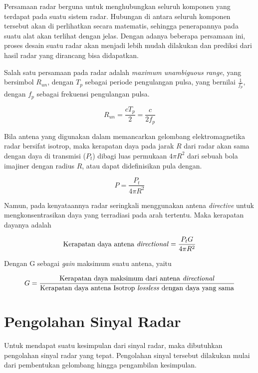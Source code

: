 
Persamaan radar berguna untuk menghubungkan seluruh komponen yang terdapat pada suatu sistem radar. Hubungan di antara seluruh komponen tersebut akan di perlihatkan secara matematis, sehingga penerapannya pada suatu alat akan terlihat dengan jelas. Dengan adanya beberapa persamaan ini, proses desain suatu radar akan menjadi lebih mudah dilakukan dan prediksi dari hasil radar yang dirancang bisa didapatkan.

Salah satu persamaan pada radar adalah \textit{maximum unambiguous range}, yang bersimbol $R_{un}$, dengan $T_{p}$ sebagai periode pengulangan pulsa, yang bernilai $\frac{1}{f_{p}}$, dengan $f_{p}$ sebagai frekuensi pengulangan pulsa.

\begin{equation}
	R_{un} = \frac{cT_{p}}{2} = \frac{c}{2f_{p}}
\end{equation}

Bila antena yang digunakan dalam memancarkan gelombang elektromagnetika radar bersifat isotrop, maka kerapatan daya pada jarak $R$ dari radar akan sama dengan daya di transmisi ($P_{t}$) dibagi luas permukaan $4\pi R^{2}$ dari sebuah bola imajiner dengan radius $R$, atau dapat didefinisikan pula dengan.

\begin{equation}
	P = \frac{P_{t}}{4\pi R^{2}}
\end{equation}

Namun, pada kenyataannya radar seringkali menggunakan antena \textit{directive} untuk mengkonsentrasikan daya yang terradiasi pada arah tertentu. Maka kerapatan dayanya adalah

\begin{equation}
	\text{Kerapatan daya antena \textit{directional}} = \frac{P_{t} G}{4\pi R^{2}}
\end{equation}

Dengan G sebagai \textit{gain} maksimum suatu antena, yaitu

\begin{equation}
	G  = \frac{\text{Kerapatan daya maksimum dari antena \textit{directional}}}{\text{Kerapatan daya antena Isotrop \textit{lossless} dengan daya yang sama}}
\end{equation}

\section{Pengolahan Sinyal Radar}
Untuk mendapat suatu kesimpulan dari sinyal radar, maka dibutuhkan pengolahan sinyal radar yang tepat. Pengolahan sinyal tersebut dilakukan mulai dari pembentukan gelombang hingga pengambilan kesimpulan. 

